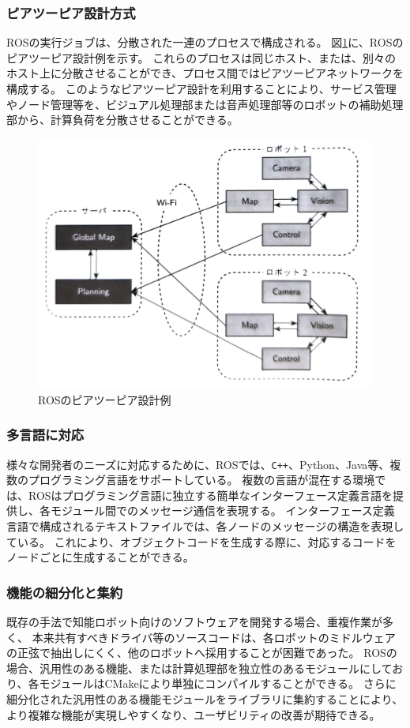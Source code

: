 \subsubsection{ピアツーピア設計方式}
ROSの実行ジョブは、分散された一連のプロセスで構成される。
図\ref{auto:rospeer}に、ROSのピアツーピア設計例を示す。
これらのプロセスは同じホスト、または、別々のホスト上に分散させることができ、プロセス間ではピアツーピアネットワークを構成する。
このようなピアツーピア設計を利用することにより、サービス管理やノード管理等を、ビジュアル処理部または音声処理部等のロボットの補助処理部から、計算負荷を分散させることができる。

\begin{figure}[h]
  \begin{center}
    \includegraphics[width=.75\linewidth]{img/auto_6.pdf}
    \caption{ROSのピアツーピア設計例}
    \label{auto:rospeer}
  \end{center}
\end{figure}

\subsubsection{多言語に対応}
様々な開発者のニーズに対応するために、ROSでは、\verb|C++|、Python、Java等、複数のプログラミング言語をサポートしている。
複数の言語が混在する環境では、ROSはプログラミング言語に独立する簡単なインターフェース定義言語を提供し、各モジュール間でのメッセージ通信を表現する。
インターフェース定義言語で構成されるテキストファイルでは、各ノードのメッセージの構造を表現している。
これにより、オブジェクトコードを生成する際に、対応するコードをノードごとに生成することができる。

\subsubsection{機能の細分化と集約}
既存の手法で知能ロボット向けのソフトウェアを開発する場合、重複作業が多く、
本来共有すべきドライバ等のソースコードは、各ロボットのミドルウェアの正弦で抽出しにくく、他のロボットへ採用することが困難であった。
ROSの場合、汎用性のある機能、または計算処理部を独立性のあるモジュールにしており、各モジュールはCMakeにより単独にコンパイルすることができる。
さらに細分化された汎用性のある機能モジュールをライブラリに集約することにより、より複雑な機能が実現しやすくなり、ユーザビリティの改善が期待できる。

